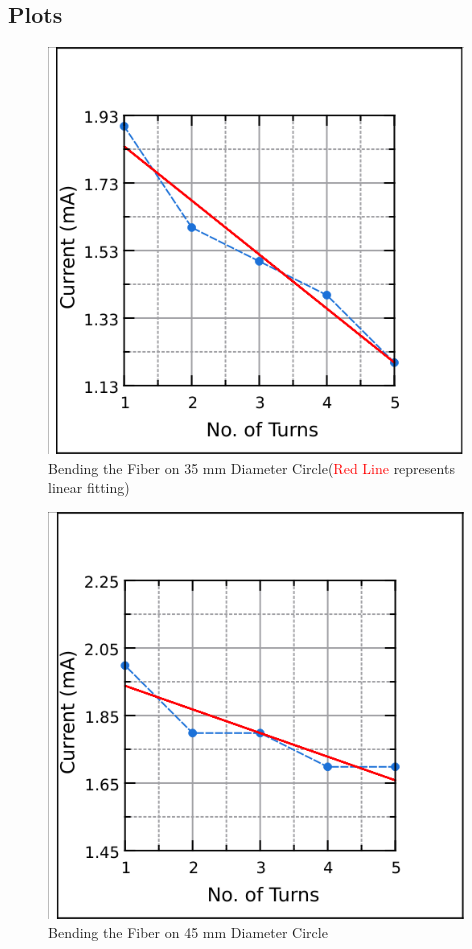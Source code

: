 \subsection{Plots}
\begin{figure}[!h]
        \centering
        \includegraphics[width = 11cm]{images/BL1.png}
        \caption{Bending the Fiber on 35 mm Diameter Circle(\textcolor{red}{Red Line} represents linear fitting)}
    \end{figure}
    \begin{figure}
        \centering
        \includegraphics[width = 11cm]{images/BL2.png}
        \caption{Bending the Fiber on 45 mm Diameter Circle}
    \end{figure}
